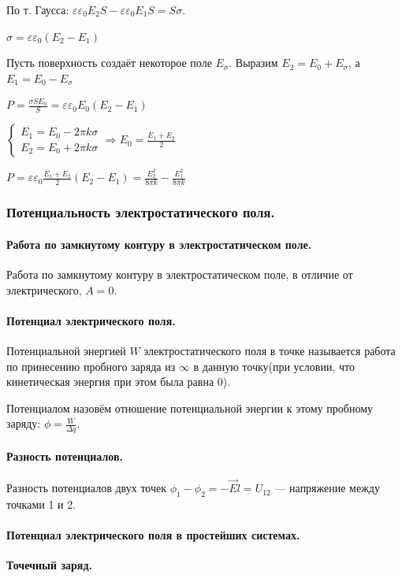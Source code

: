 \documentclass{article}
\begin{document}
                По т. Гаусса: \(\varepsilon\varepsilon_0 E_2 S - \varepsilon\varepsilon_0 E_1 S = S\sigma\).
                
                \(\sigma = \varepsilon\varepsilon_0(E_2 - E_1)\)

                Пусть поверхность создаёт некоторое поле \(E_\sigma\). Выразим \(E_2 = E_0 + E_\sigma\), а \(E_1 = E_0 - E_\sigma\)

                \(P = \frac{\sigma S E_0}{S} = \varepsilon\varepsilon_0 E_0(E_2 - E_1)\)

                \(\begin{cases}
                        E_1 = E_0 - 2\pi k \sigma\\
                        E_2 = E_0 + 2\pi k \sigma
                    \end{cases} \Rightarrow E_0 = \frac{E_1+E_2}{2}\)

                \(P = \varepsilon\varepsilon_0 \frac{E_1 + E_2}{2}(E_2 - E_1) = \frac{E_2^2}{8\pi k} - \frac{E_1^2}{8\pi k}\)
        \subsubsection{Потенциальность электростатического поля.}
            \paragraph{Работа по замкнутому контуру в электростатическом поле.}
                Работа по замкнутому контуру в электростатическом поле, в отличие от электрического, \(A = 0\).
            \paragraph{Потенциал электрического поля.}
                Потенциальной энергией \(W\) электростатического поля в точке называется работа по принесению пробного заряда из \(\infty\) в данную точку(при условии, что кинетическая энергия при этом была равна \(0\)).

                Потенциалом назовём отношение потенциальной энергии к этому пробному заряду: \(\phi = \frac{W}{\Delta q}\).
            \paragraph{Разность потенциалов.}
                Разность потенциалов двух точек \(\phi_1 - \phi_2 = -\vec E l = U_{12}\) --- напряжение между точками 1 и 2.
            \paragraph{Потенциал электрического поля в простейших системах.}
                \textbf{Точечный заряд.}
                
\end{document}
